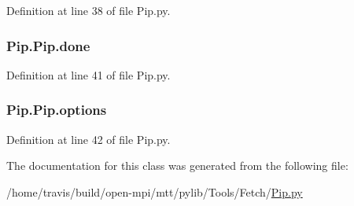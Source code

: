 Definition at line 38 of file Pip.\-py.

\hypertarget{class_pip_1_1_pip_adaa42730d39533e28bf8f74c8de40110}{
\subsubsection[{done}]{\setlength{\rightskip}{0pt plus 5cm}Pip.\-Pip.\-done}}\label{class_pip_1_1_pip_adaa42730d39533e28bf8f74c8de40110}


Definition at line 41 of file Pip.\-py.

\hypertarget{class_pip_1_1_pip_a81ef2ef6560b4befa1626bedb3fe96da}{
\subsubsection[{options}]{\setlength{\rightskip}{0pt plus 5cm}Pip.\-Pip.\-options}}\label{class_pip_1_1_pip_a81ef2ef6560b4befa1626bedb3fe96da}


Definition at line 42 of file Pip.\-py.



The documentation for this class was generated from the following file\-:\begin{DoxyCompactItemize}
\item 
/home/travis/build/open-\/mpi/mtt/pylib/\-Tools/\-Fetch/\hyperlink{_pip_8py}{Pip.\-py}\end{DoxyCompactItemize}
